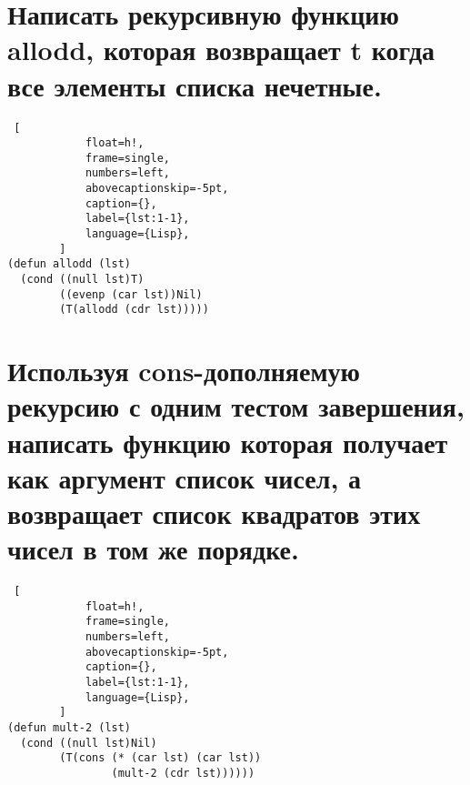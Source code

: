     \section{Написать рекурсивную функцию allodd, которая возвращает t когда все элементы списка нечетные.}
    
        \begin{lstlisting} [
        	float=h!,
        	frame=single,
        	numbers=left,
        	abovecaptionskip=-5pt,
        	caption={},
        	label={lst:1-1},
        	language={Lisp},
        ]
(defun allodd (lst)
  (cond ((null lst)T)
        ((evenp (car lst))Nil)
        (T(allodd (cdr lst)))))
        \end{lstlisting}

    \section{Используя cons-дополняемую рекурсию с одним тестом завершения, написать функцию которая получает как аргумент список чисел, а возвращает список квадратов этих чисел в том же порядке.}
    
        \begin{lstlisting} [
        	float=h!,
        	frame=single,
        	numbers=left,
        	abovecaptionskip=-5pt,
        	caption={},
        	label={lst:1-1},
        	language={Lisp},
        ]
(defun mult-2 (lst)
  (cond ((null lst)Nil)
        (T(cons (* (car lst) (car lst))
                (mult-2 (cdr lst))))))
        \end{lstlisting}
